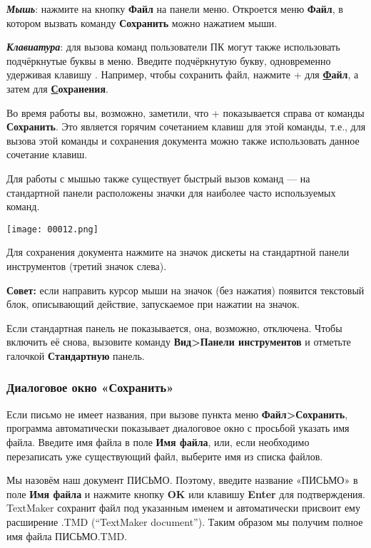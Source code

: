 \documentclass[a4paper,10pt]{article}
\begin{document}
\textbf{\textit{Мышь}}: нажмите на кнопку \textbf{Файл} на панели меню. Откроется меню \textbf{Файл}, в котором вызвать команду \textbf{Сохранить} можно нажатием мыши.

\textbf{\textit{Клавиатура}}: для вызова команд пользователи ПК могут также использовать подчёркнутые буквы в меню. Введите подчёркнутую букву, одновременно удерживая клавишу . Например, чтобы сохранить файл, нажмите + для \textbf{\underline{Ф}айл}, а затем  для \textbf{\underline{С}охранения}. 

Во время работы вы, возможно, заметили, что + показывается справа от команды \textbf{Сохранить}. Это является горячим сочетанием клавиш для этой команды, т.е., для вызова этой команды и сохранения документа можно также использовать данное сочетание клавиш.

Для работы с мышью также существует быстрый вызов команд --- на стандартной панели расположены значки для наиболее часто используемых команд. 

\texttt{[image: 00012.png]}

Для сохранения документа нажмите на значок дискеты на стандартной панели инструментов (третий значок слева).

\begin{mdframed}[backgroundcolor=blue!10]
\textbf{Совет:} если направить курсор мыши на значок (без нажатия) появится текстовый блок, описывающий действие, запускаемое при нажатии на значок.
\end{mdframed}

Если стандартная панель не показывается, она, возможно, отключена. Чтобы включить её снова, вызовите команду \textbf{Вид>Панели инструментов} и отметьте галочкой \textbf{Стандартную} панель. 

\subsubsection{Диалоговое окно «Сохранить»}
Если письмо не имеет названия, при вызове пункта меню \textbf{Файл>Сохранить}, программа автоматически показывает диалоговое окно с просьбой указать имя файла. Введите имя файла в поле \textbf{Имя файла}, или, если необходимо перезаписать уже существующий файл, выберите имя из списка файлов.

Мы назовём наш документ ПИСЬМО. Поэтому, введите название «ПИСЬМО» в поле \textbf{Имя файла} и нажмите кнопку \textbf{OK} или клавишу \textbf{Enter} для подтверждения. TextMaker сохранит файл под указанным именем и автоматически присвоит ему расширение .TMD (“TextMaker document”). Таким образом мы получим полное имя файла ПИСЬМО.TMD.
\end{document}
